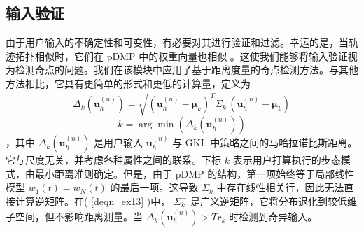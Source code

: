    \subsection{输入验证  }    由于用户输入的不确定性和可变性，有必要对其进行验证和过滤。幸运的是，当轨迹拓扑相似时，它们在 pDMP 中的权重向量也相似    \cite{ijspeertDynamicalMovementPrimitives2013}    。这使我们能够将输入验证视为检测奇点的问题。我们在该模块中应用了基于距离度量的奇点检测方法。与其他方法相比，它具有更简单的形式和更低的计算量，定义为
    \begin{equation}
  \label{deqn_ex13}
  {\Delta _k}({\pmb{u}}_h^{(n)}) = \sqrt {{{({\pmb{u}}_h^{(n)} - {{\pmb{\mu }}_k})}^T}\Sigma _k^ - ({\pmb{u}}_h^{(n)} - {{\pmb{\mu }}_k})} 
\end{equation}   
    \begin{equation}
  \label{deqn_ex14}
  k = \arg \min \left( {{\Delta _k}({\pmb{u}}_h^{(n)})} \right)
\end{equation}   ，其中    ${\Delta _k}(\pmb{u}_h^{(n)})$    是用户输入    ${\pmb{u}}_h^{(n)}$    与 GKL 中策略之间的马哈拉诺比斯距离。它与尺度无关，并考虑各种属性之间的联系。下标   $k$   表示用户打算执行的步态模式，由最小距离准则确定。但是，由于 pDMP 的结构，第一项始终等于局部线性模型    ${w_1}(t) = {w_N}(t)$    的最后一项。这导致    ${\Sigma _k}$    中存在线性相关行，因此无法直接计算逆矩阵。在(    \ref{deqn_ex13}    )中，   $\Sigma _k^ - $   是广义逆矩阵，它将分布退化到较低维子空间，但不影响距离测量。当    ${\Delta _k}(\pmb{u}_h^{(n)}) > T{r_k}$    时检测到奇异输入。  

